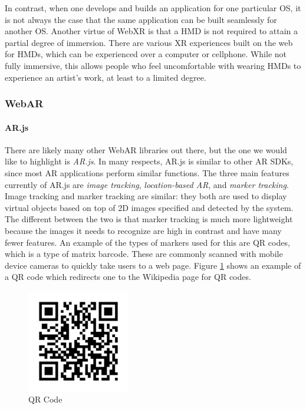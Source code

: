 In contrast, when one develops and builds an application for one particular OS, it is not always the case that the same application can be built seamlessly for another OS. Another virtue of WebXR is that a HMD is not required to attain a partial degree of immersion. There are various XR experiences built on the web for HMDs, which can be experienced over a computer or cellphone. While not fully immersive, this allows people who feel uncomfortable with wearing HMDs to experience an artist's work, at least to a limited degree. 

\subsubsection{WebAR}
\paragraph{AR.js}

There are likely many other WebAR libraries out there, but the one we would like to highlight is \textit{AR.js}. In many respects, AR.js is similar to other AR SDKs, since most AR applications perform similar functions. The three main features currently of AR.js are \textit{image tracking}, \textit{location-based AR}, and \textit{marker tracking}. Image tracking and marker tracking are similar: they both are used to display virtual objects based on top of 2D images specified and detected by the system. The different between the two is that marker tracking is much more lightweight because the images it needs to recognize are high in contrast and have many fewer features. An example of the types of markers used for this are QR codes, which is a type of matrix barcode. These are commonly scanned with mobile device cameras to quickly take users to a web page. Figure \ref{img:qr-code} shows an example of a QR code which redirects one to the Wikipedia page for QR codes.

\begin{figure}[ht!]%
\centering
\includegraphics[width=0.4\textwidth]{img/qr-code.png} 
\caption{QR Code \cite{QRcodefo71online}}
\label{img:qr-code}
\end{figure}

